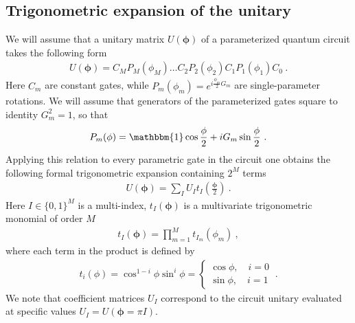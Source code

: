 \documentclass[twocolumn, amsfonts, amssymb, aps, nofootinbib]{revtex4-2}
\begin{document}
\subsection{Trigonometric expansion of the unitary}
We will assume that a unitary matrix $U(\pmb{\phi})$ of a parameterized quantum circuit takes the following form 
\begin{align}
	U(\pmb{\phi})=C_M P_M(\phi_M)\dots C_2P_2(\phi_2)C_1 P_1(\phi_1) C_0 \ . \label{U phi}
\end{align}
Here $C_m$ are constant gates, while $P_m(\phi_m)=e^{i\frac{\phi_m}{2} G_m}$ are single-parameter rotations. We will assume that generators of the parameterized gates square to identity $G_m^2=1$, so that
\begin{align}
	P_m(\phi)=\mathbbm{1}\cos\frac{\phi}{2}+iG_m\sin\frac{\phi}{2} \ .
\end{align}
Applying this relation to every parametric gate in the circuit one obtains the following formal trigonometric expansion containing $2^M$ terms
\begin{align}
	U(\pmb{\phi})=\sum_I U_I t_I\left(\frac{\pmb{\phi}}2\right) \ . \label{U expansion}
\end{align}
Here $I\in\{0,1\}^M$ is a multi-index, $t_I(\pmb{\phi})$ is a multivariate trigonometric monomial of order $M$
\begin{align}
	t_I(\pmb{\phi})=\prod_{m=1}^M t_{I_m}(\phi_m) \label{t def} \ ,
\end{align}
where each term in the product is defined by
\begin{align}
	t_i(\phi)=\cos^{1-i}\phi\sin^i\phi=\begin{cases}\cos\phi,\quad i=0\\\sin\phi,\quad i=1\end{cases} \ .
\end{align}
We note that coefficient matrices $U_I$ correspond to the circuit unitary evaluated at specific values $U_I=U(\pmb{\phi}=\pi I)$.
\end{document}
